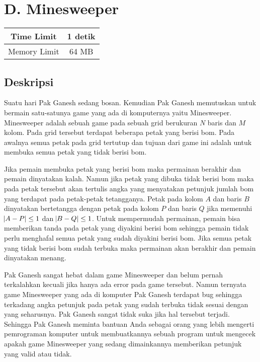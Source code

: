 \documentclass{article}
\begin{document}
\section*{\hfil D. Minesweeper\hfil}

\begin{center}
\begin{tabular}{ |cc| } 
 \hline
 Time Limit & 1 detik \\ 
 \hline
 Memory Limit & 64 MB \\
 \hline
\end{tabular}
\end{center}

\subsection*{Deskripsi}

\par\noindent
Suatu hari Pak Ganesh sedang bosan. Kemudian Pak Ganesh memutuskan untuk bermain satu-satunya game yang ada di komputernya yaitu Minesweeper. Minesweeper adalah sebuah game pada sebuah grid berukuran $N$ baris dan $M$ kolom. Pada grid tersebut terdapat beberapa petak yang berisi bom. Pada awalnya semua petak pada grid tertutup dan tujuan dari game ini adalah untuk membuka semua petak yang tidak berisi bom.
\newline
\par\noindent
Jika pemain membuka petak yang berisi bom maka permainan berakhir dan pemain dinyatakan kalah. Namun jika petak yang dibuka tidak berisi bom maka pada petak tersebut akan tertulis angka yang menyatakan petunjuk jumlah bom yang terdapat pada petak-petak tetangganya. Petak pada kolom $A$ dan baris $B$ dinyatakan bertetangga dengan petak pada kolom $P$ dan baris $Q$ jika memenuhi $\abs{A-P}\leq 1$ dan $\abs{B-Q} \leq 1$. Untuk mempermudah permainan, pemain bisa memberikan tanda pada petak yang diyakini berisi bom sehingga pemain tidak perlu menghafal semua petak yang sudah diyakini berisi bom. Jika semua petak yang tidak berisi bom sudah terbuka maka permainan akan berakhir dan pemain dinyatakan menang.
\newline
\par\noindent
Pak Ganesh sangat hebat dalam game Minesweeper dan belum pernah terkalahkan kecuali jika hanya ada error pada game tersebut. Namun ternyata game Minesweeper yang ada di komputer Pak Ganesh terdapat bug sehingga terkadang angka petunjuk pada petak yang sudah terbuka tidak sesuai dengan yang seharusnya. Pak Ganesh sangat tidak suka jika hal tersebut terjadi. Sehingga Pak Ganesh meminta bantuan Anda sebagai orang yang lebih mengerti pemrograman komputer untuk membuatkannya sebuah program untuk mengecek apakah game Minesweeper yang sedang dimainkannya memberikan petunjuk yang valid atau tidak.
\end{document}
